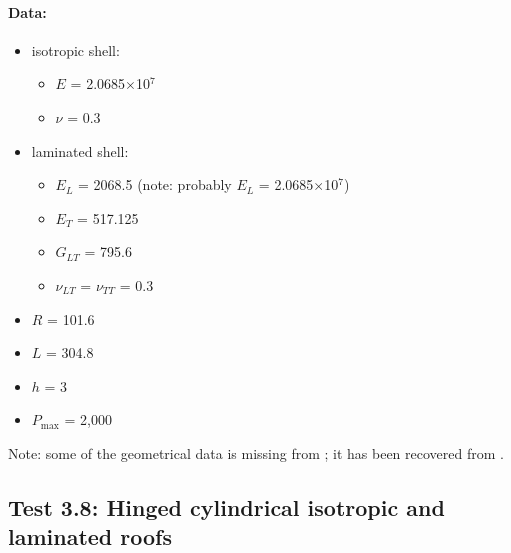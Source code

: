 \documentclass{article}
\begin{document}
\paragraph{Data:}
\begin{itemize}
\item isotropic shell:
	\begin{itemize}
	\item $E$ = 2.0685$\times$10$^7$
	\item $\nu$ = 0.3
	\end{itemize}
\item laminated shell:
	\begin{itemize}
	\item $E_L$ = 2068.5 (note: probably $E_L$ = 2.0685$\times$10$^7$)
	\item $E_T$ = 517.125
	\item $G_{LT}$ = 795.6
	\item $\nu_{LT}$ = $\nu_{TT}$ = 0.3
	\end{itemize}
\item $R$ = 101.6
\item $L$ = 304.8
\item $h$ = 3
\item $P_\text{max}$ = 2,000
\end{itemize}
Note: some of the geometrical data is missing from \cite{SZE-2004};
it has been recovered from \cite{SZE-2002}.


\subsection{Test 3.8: Hinged cylindrical isotropic and laminated roofs}




\end{document}
